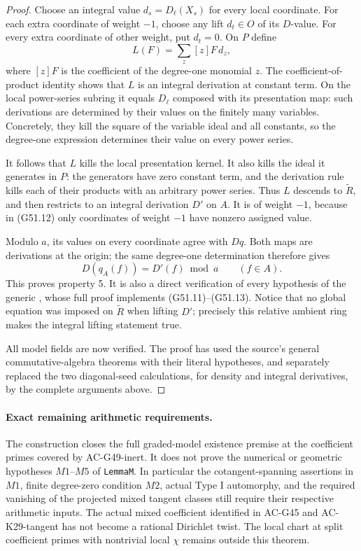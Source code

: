 \begin{proof}
Choose an integral value $d_s=D_\ell(X_s)$ for every
local coordinate.  For each extra coordinate of
weight $-1$, choose any lift $d_t\in O$ of its
$D$-value.  For every extra coordinate of other weight,
put $d_t=0$.
On $P$ define
\[
 L(F)=\sum_z [z]F\,d_z,                                    \tag{G51.12}
\]
where $[z]F$ is the coefficient of the degree-one
monomial $z$.  The coefficient-of-product identity
shows that $L$ is an integral derivation at constant
term.  On the local power-series subring it equals
$D_\ell$ composed with its presentation map: such
derivations are determined by their values on the
finitely many variables.  Concretely, they kill the
square of the variable ideal and all constants, so
the degree-one expression determines their value on
every power series.

It follows that $L$ kills the local presentation kernel.
It also kills the ideal it generates in $P$: the
generators have zero constant term, and the derivation
rule kills each of their products with an arbitrary
power series.  Thus $L$ descends to $\widetilde R$,
and then restricts to an integral derivation $D'$ on
$A$.  It is of weight $-1$, because in (G51.12) only
coordinates of weight $-1$ have nonzero assigned value.

Modulo $a$, its values on every coordinate agree with
$Dq$.  Both maps are derivations at the origin; the
same degree-one determination therefore gives
\[
                     D(q_A(f))=D'(f)\bmod a\qquad(f\in A).
                                                               \tag{G51.13}
\]
This proves property 5.
It is also a direct verification of every hypothesis
of the generic
,
whose full proof implements (G51.11)--(G51.13).
Notice that no global equation was imposed on
$\widetilde R$ when lifting $D'$; precisely this relative
ambient ring makes the integral lifting statement true.

All model fields are now verified.  The proof has used
the source's general commutative-algebra theorems with
their literal hypotheses, and separately replaced the
two diagonal-seed calculations, for density and integral
derivatives, by the complete arguments above.
\end{proof}

\paragraph{Exact remaining arithmetic requirements.}
The construction closes the full graded-model existence
premise at the coefficient primes covered by AC-G49-inert.
It does not prove the numerical or geometric hypotheses
$M1$--$M5$ of \texttt{LemmaM}.
In particular the cotangent-spanning assertions in $M1$,
finite degree-zero condition $M2$, actual Type I automorphy,
and the required vanishing of the projected mixed tangent
classes still require their respective arithmetic inputs.
The actual mixed coefficient identified in AC-G45 and
AC-K29-tangent has not become a rational Dirichlet twist.
The local chart at split coefficient primes with nontrivial
local $\chi$ remains outside this theorem.

